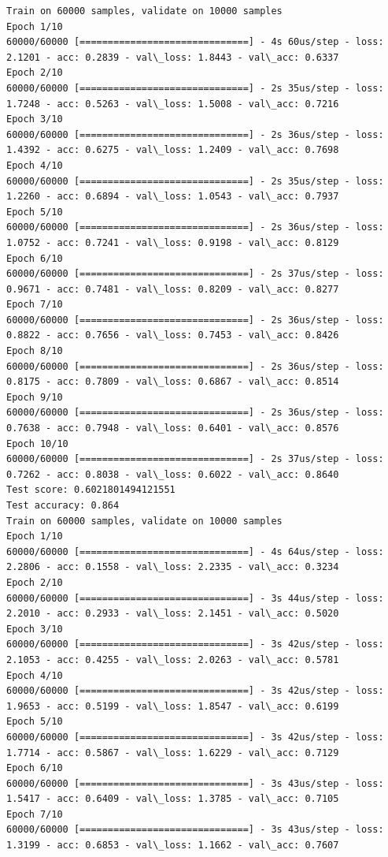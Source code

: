 \documentclass[11pt]{article}
\begin{document}
    \begin{Verbatim}[commandchars=\\\{\}]
Train on 60000 samples, validate on 10000 samples
Epoch 1/10
60000/60000 [==============================] - 4s 60us/step - loss: 2.1201 - acc: 0.2839 - val\_loss: 1.8443 - val\_acc: 0.6337
Epoch 2/10
60000/60000 [==============================] - 2s 35us/step - loss: 1.7248 - acc: 0.5263 - val\_loss: 1.5008 - val\_acc: 0.7216
Epoch 3/10
60000/60000 [==============================] - 2s 36us/step - loss: 1.4392 - acc: 0.6275 - val\_loss: 1.2409 - val\_acc: 0.7698
Epoch 4/10
60000/60000 [==============================] - 2s 35us/step - loss: 1.2260 - acc: 0.6894 - val\_loss: 1.0543 - val\_acc: 0.7937
Epoch 5/10
60000/60000 [==============================] - 2s 36us/step - loss: 1.0752 - acc: 0.7241 - val\_loss: 0.9198 - val\_acc: 0.8129
Epoch 6/10
60000/60000 [==============================] - 2s 37us/step - loss: 0.9671 - acc: 0.7481 - val\_loss: 0.8209 - val\_acc: 0.8277
Epoch 7/10
60000/60000 [==============================] - 2s 36us/step - loss: 0.8822 - acc: 0.7656 - val\_loss: 0.7453 - val\_acc: 0.8426
Epoch 8/10
60000/60000 [==============================] - 2s 36us/step - loss: 0.8175 - acc: 0.7809 - val\_loss: 0.6867 - val\_acc: 0.8514
Epoch 9/10
60000/60000 [==============================] - 2s 36us/step - loss: 0.7638 - acc: 0.7948 - val\_loss: 0.6401 - val\_acc: 0.8576
Epoch 10/10
60000/60000 [==============================] - 2s 37us/step - loss: 0.7262 - acc: 0.8038 - val\_loss: 0.6022 - val\_acc: 0.8640
Test score: 0.6021801494121551
Test accuracy: 0.864
Train on 60000 samples, validate on 10000 samples
Epoch 1/10
60000/60000 [==============================] - 4s 64us/step - loss: 2.2806 - acc: 0.1558 - val\_loss: 2.2335 - val\_acc: 0.3234
Epoch 2/10
60000/60000 [==============================] - 3s 44us/step - loss: 2.2010 - acc: 0.2933 - val\_loss: 2.1451 - val\_acc: 0.5020
Epoch 3/10
60000/60000 [==============================] - 3s 42us/step - loss: 2.1053 - acc: 0.4255 - val\_loss: 2.0263 - val\_acc: 0.5781
Epoch 4/10
60000/60000 [==============================] - 3s 42us/step - loss: 1.9653 - acc: 0.5199 - val\_loss: 1.8547 - val\_acc: 0.6199
Epoch 5/10
60000/60000 [==============================] - 3s 42us/step - loss: 1.7714 - acc: 0.5867 - val\_loss: 1.6229 - val\_acc: 0.7129
Epoch 6/10
60000/60000 [==============================] - 3s 43us/step - loss: 1.5417 - acc: 0.6409 - val\_loss: 1.3785 - val\_acc: 0.7105
Epoch 7/10
60000/60000 [==============================] - 3s 43us/step - loss: 1.3199 - acc: 0.6853 - val\_loss: 1.1662 - val\_acc: 0.7607

\end{Verbatim}
\end{document}
